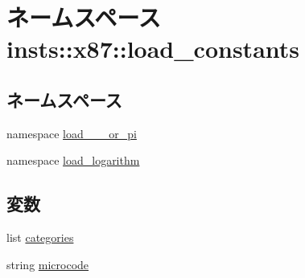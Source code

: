 \hypertarget{namespaceinsts_1_1x87_1_1load__constants}{
\section{ネームスペース insts::x87::load\_\-constants}
\label{namespaceinsts_1_1x87_1_1load__constants}
}
\subsection*{ネームスペース}
\begin{DoxyCompactItemize}
\item 
namespace \hyperlink{namespaceinsts_1_1x87_1_1load__constants_1_1load__0__1__or__pi}{load\_\_\_\-or\_\-pi}
\item 
namespace \hyperlink{namespaceinsts_1_1x87_1_1load__constants_1_1load__logarithm}{load\_\-logarithm}
\end{DoxyCompactItemize}
\subsection*{変数}
\begin{DoxyCompactItemize}
\item 
list \hyperlink{namespaceinsts_1_1x87_1_1load__constants_a273cf0f1630af14c1582f05e53354a55}{categories}
\item 
string \hyperlink{namespaceinsts_1_1x87_1_1load__constants_a770f11a173e99389a8802f0107ed8f52}{microcode}
\end{DoxyCompactItemize}


